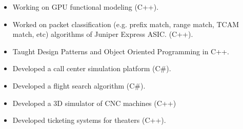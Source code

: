 \begin{itemize}
	\item Working on GPU functional modeling (C++).
\end{itemize}

\divider

\begin{itemize}
	\item Worked on packet classification (e.g. prefix match, range match, TCAM match, etc) algorithms of Juniper Express ASIC. (C++).
\end{itemize}

\divider

\begin{itemize}
	\item Taught Design Patterns and Object Oriented Programming in C++.
\end{itemize}

\divider

\begin{itemize}
	\item Developed a call center simulation platform (C\#).
\end{itemize}

\divider

\begin{itemize}
	\item Developed a flight search algorithm (C\#).
\end{itemize}

\divider

\begin{itemize}
\item Developed a 3D simulator of CNC machines (C++)
\end{itemize}

\divider

\begin{itemize}
	\item Developed ticketing systems for theaters (C++).
\end{itemize}

